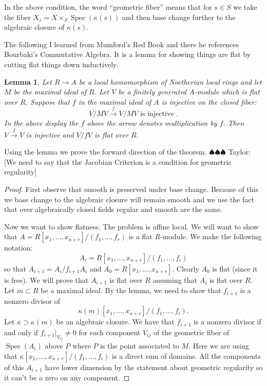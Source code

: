 \documentclass[12pt]{article}
\numberwithin{equation}{section}
\newtheorem{lemma}[theorem]{Lemma}
\theoremstyle{definition}
\theoremstyle{remark}
\newcommand{\Spec}{\operatorname{Spec}}
\newcommand{\taylor}[1]{{\color{blue} \sf $\spadesuit\spadesuit\spadesuit$ Taylor: [#1]}}
\begin{document}
In the above condition, the word ``geometric fiber'' means that for $s\in S$ we take the fiber $X_s = X\times_S \Spec(\kappa(s))$ and then base change further to the algebraic closure of $\kappa(s)$.

The following I learned from Mumford's Red Book and there he references Bourbaki's Commutative Algebra.
It is a lemma for showing things are flat by cutting flat things down inductively. 
\begin{lemma}
	Let $R\to A$ be a local homomorphism of Noetherian local rings and let $M$ be the maximal ideal of $R$. 
	Let $V$ be a finitely generated $A$-module which is flat over $R$.
	Suppose that $f$ in the maximal ideal of $A$ is injective on the closed fiber: 
	$$ V/MV\xrightarrow{f}V/MV \mbox{ is injective }.$$ In the above display the $f$ above the arrow denotes multiplication by $f$. 
	Then $V\xrightarrow{f}V$ is injective and $V/fV$ is flat over $R$.
\end{lemma}

Using the lemma we prove the forward direction of the theorem. \taylor{We need to say that the Jacobian Criterion is a condition for geometric regularity} 
\begin{proof}
	First observe that smooth is preserved under base change. 
	Because of this we base change to the algebraic closure will remain smooth and we use the fact that over algebraically closed fields regular and smooth are the same.
	
	Now we want to show flatness.
	The problem is affine local. 
	We will want to show that $A = R[x_1,\ldots,x_{n+r}]/(f_1,\ldots,f_r)$ is a flat $R$-module. 
	We make the following notation:
	$$ A_i = R[x_1,\ldots,x_{n+r}]/(f_1,\ldots,f_i) $$
	so that $A_{i+1}=A_i/f_{i+1}A_i$ and $A_0 = R[x_1,\ldots,x_{n+r}]$. 
	Clearly $A_0$ is flat (since it is free).
	We will prove that $A_{i+1}$ is flat over $R$ assuming that $A_i$ is flat over $R$.
	Let $m \subset R$ be a maximal ideal. 
	By the lemma, we need to show that $f_{i+1}$ is a nonzero divisor of 
	$$\kappa(m)[x_1,\ldots,x_{n+r}]/(f_1,\ldots,f_i).$$ 
	Let $\overline{\kappa} \supset \kappa(m)$ be an algebraic closure. 
	We have that $f_{i+1}$ is a nonzero divisor if and only if $f_{i+1}\vert_{V_{ij}}\neq 0$ for each component $V_{ij}$ of the geometric fiber of $\Spec(A_i)$ above $P$ where $P$ is the point associated to $M$. 
	Here we are using that $\overline{\kappa}[x_1,\ldots,x_{n+r}]/(f_1,\ldots,f_i)$ is a direct sum of domains. 
	All the components of this $A_{i+1}$ have lower dimension by the statement about geometric regularity so it can't be a zero on any component.
\end{proof}
\end{document}
